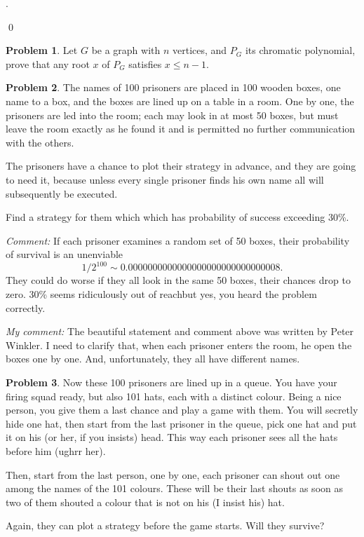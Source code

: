 \documentclass[12pt]{article}
\theoremstyle{definition}
\newtheorem{hw}{Problem}
\newenvironment{sol}
  {\par\vspace{3mm}\noindent{\it Solution}.}
  {\qed}
\begin{document}
\begin{sol}
	

	
\end{sol}

\begin{hw}
Let $G$ be a graph with $n$ vertices, and $P_G$ its chromatic
polynomial,
prove that any root $x$ of $P_G$ satisfies $x \leq n-1$.
\end{hw}

\begin{hw} 
The names of 100 prisoners are placed in 100 wooden boxes, one name to a box, and the boxes are
lined up on a table in a room. One by one, the prisoners are led into the room; each may look
in at most 50 boxes, but must leave the room exactly as he found it and is permitted no further
communication with the others.

The prisoners have a chance to plot their strategy in advance, and they are going to need it,
because unless every single prisoner finds his own name all will subsequently be executed.

Find a strategy for them which which has probability of success exceeding 30\%.
\end{hw}

{\em Comment:} If each prisoner examines a random set of 50 boxes, their probability of survival
is an unenviable 
\[1/2^{100} \sim 0.0000000000000000000000000000008.\] They could do worse if they all
look in the same 50 boxes, their chances drop to zero. 30\% seems ridiculously out of reachbut
yes, you heard the problem correctly.

{\em My comment:} The beautiful statement and comment above was written by Peter Winkler. I need
to clarify that, when each prisoner enters the room, he open
the boxes one by one. And, unfortunately, they all have different names.

\begin{hw}
Now these 100 prisoners are lined up in a queue. You have your firing squad ready, but also 101 hats, each with a distinct colour. 
Being a nice person, you give them a last chance and play a game with them. You will secretly hide one hat, then start from the last prisoner in the queue, pick one hat and put it on his (or her, if you insists) head. This way each prisoner sees all the hats before him
(ughrr her).

Then, start from the last person, one by one, each prisoner can shout out one among the names of the 101 colours. These will be their last shouts as soon as two of them shouted a colour that is not on his (I insist his) hat.

Again, they can plot a strategy before the game starts. Will they survive?
\end{hw}
\end{document}
